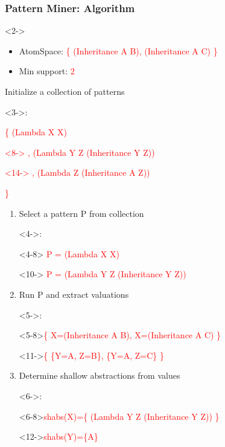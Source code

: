 \documentclass{beamer}
\begin{document}
\begin{frame}[fragile]
  \frametitle{Pattern Miner: Algorithm}

  {\tiny
    \begin{visibleenv}<2->
      \begin{itemize}
      \item AtomSpace: \textcolor{red}{\{ (Inheritance A B), (Inheritance A C) \}}
      \item Min support: \textcolor{red}{2}
      \end{itemize}
  \end{visibleenv}}
  
{\tiny Initialize a collection of patterns\begin{visibleenv}<3->:
    \textcolor{red}{\{ (Lambda X X)\begin{onlyenv}<8-> , (Lambda Y
        Z (Inheritance Y Z))\end{onlyenv}\begin{onlyenv}<14-> , (Lambda
        Z (Inheritance A Z))\end{onlyenv} \}}
  \end{visibleenv}
  
  \begin{enumerate}
  \item \alert{Select a pattern P} from collection\begin{onlyenv}<4->:\end{onlyenv}\begin{onlyenv}<4-8>
      \textcolor{red}{P = (Lambda X X)}
    \end{onlyenv}\begin{onlyenv}<10->
      \textcolor{red}{P = (Lambda Y Z (Inheritance Y Z))}
    \end{onlyenv}
  \item Run P and \alert{extract valuations}\begin{onlyenv}<5->:\end{onlyenv}
    \begin{onlyenv}<5-8>\textcolor{red}{\{ X=(Inheritance A B),
        X=(Inheritance A C) \}}
      \end{onlyenv}\begin{onlyenv}<11->\textcolor{red}{\{ \{Y=A, Z=B\},
        \{Y=A, Z=C\} \}}
      \end{onlyenv}
  \item Determine \alert{shallow abstractions} from
    values\begin{onlyenv}<6->:\end{onlyenv}
    \begin{onlyenv}<6-8>\textcolor{red}{shabs(X)=\{ (Lambda Y Z
        (Inheritance Y Z)) \}}
    \end{onlyenv}\begin{onlyenv}<12->\textcolor{red}{shabs(Y)=\{A\}}
    \end{onlyenv}


\end{enumerate}}
\end{frame}
\end{document}
